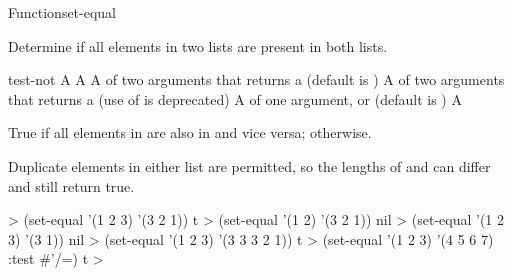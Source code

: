 \documentclass[10pt,twoside,english,pdftex]{article}
\begin{document}
\begin{functiondoc}{Function}{set-equal}{%
    }

\fnsyntax

\fnpurpose Determine if all elements in two lists are present in both lists.

\fnpackage {}

\fnmodule {}

\fnargs
\begin{args}{test-not}
\arg[list-1] A 
\arg[list-2] A 
\arg[test] A  of two arguments that returns a
 (default is ) 
 A  of two arguments that returns a
 (use of  is deprecated)
\arg[key] A  of one argument, or \nil{} (default is \nil)
\arg[boolean] A 
\end{args}

\fnreturns True if all elements in  are also in
 and vice versa; \nil{} otherwise.

\fndescription Duplicate elements in either list are permitted, so the lengths
of  and  can differ and still return
true.

\fnexamples
%
\W\supp
\begin{example}
  > (set-equal '(1 2 3) '(3 2 1))
  t
  > (set-equal '(1 2) '(3 2 1))
  nil\goodpagebreak
  > (set-equal '(1 2 3) '(3 1))
  nil
  > (set-equal '(1 2 3) '(3 3 3 2 1))
  t
  > (set-equal '(1 2 3) '(4 5 6 7) :test #'/=)
  t
  >
\end{example}

\end{functiondoc}

\end{document}
